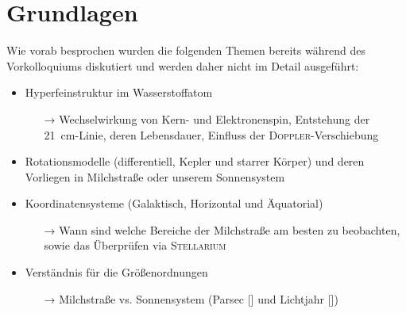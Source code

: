 \section{Grundlagen}
Wie vorab besprochen wurden die folgenden Themen bereits während des Vorkolloquiums diskutiert und werden daher nicht im Detail ausgeführt:
\begin{itemize}
    \item Hyperfeinstruktur im Wasserstoffatom
    \begin{itemize}
        \item[→] Wechselwirkung von Kern- und Elektronenspin, Entstehung der \SI{21}{\centi \metre}-Linie, deren Lebensdauer, Einfluss der \textsc{Doppler}-Verschiebung
    \end{itemize}
    \item Rotationsmodelle (differentiell, Kepler und starrer Körper) und deren Vorliegen in Milchstraße oder unserem Sonnensystem
    \item Koordinatensysteme (Galaktisch, Horizontal und Äquatorial)
    \begin{itemize}
        \item[→] Wann sind welche Bereiche der Milchstraße am besten zu beobachten, sowie das Überprüfen via \textsc{Stellarium} 
    \end{itemize}
    \item Verständnis für die Größenordnungen
    \begin{itemize}
        \item[→] Milchstraße vs. Sonnensystem (Parsec [\si{\parsec}] und Lichtjahr [\si{\lightyear}])
    \end{itemize}
\end{itemize}